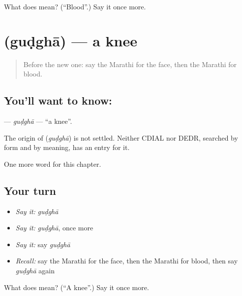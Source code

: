 \begin{tcolorbox}[breakable,colback=teal!4,colframe=teal!35!black,title={Before you move on}]
What does  mean? (\textquotedblleft{}Blood\textquotedblright{}.) Say it once more.
\end{tcolorbox}
\section[\texorpdfstring{\mr{गुडघा} (guḍghā)}{गुडघा (guḍghā)}]{ (guḍghā) — a knee}

\label{lesson:MR-C72-gudgha}



\begin{quote}
Before the new one: say the Marathi for the face, then the Marathi for blood.
\end{quote}

\subsection*{You'll want to know: }
\textbf{} — \emph{guḍghā} — \textquotedblleft{}a knee\textquotedblright{}.

\begin{cousinweb}
The origin of \textbf{} (\emph{guḍghā}) is not settled. Neither CDIAL nor DEDR, searched by form and by meaning, has an entry for it.
\end{cousinweb}

\begin{grammarlens}[title={What you've built}]
One more word for this chapter.
\end{grammarlens}

\subsection*{Your turn}
\begin{itemize}
\raggedright
  \item \emph{Say it:} \emph{guḍghā}
  \item \emph{Say it:} \emph{guḍghā}, once more
  \item \emph{Say it:} say \emph{guḍghā}
  \item \emph{Recall:} say the Marathi for the face, then the Marathi for blood, then say \emph{guḍghā} again
\end{itemize}

\begin{tcolorbox}[breakable,colback=teal!4,colframe=teal!35!black,title={Before you move on}]
What does  mean? (\textquotedblleft{}A knee\textquotedblright{}.) Say it once more.
\end{tcolorbox}
